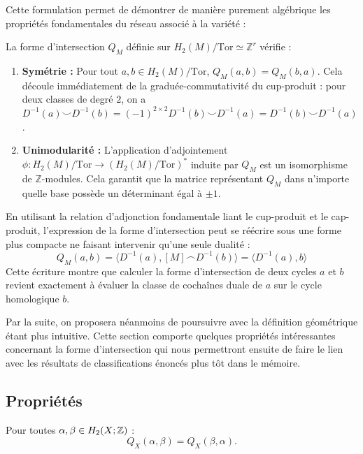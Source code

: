 Cette formulation permet de démontrer de manière purement algébrique les propriétés fondamentales du réseau associé à la variété :

\begin{proposition}
La forme d'intersection $Q_M$ définie sur $H_2(M)/\text{Tor} \simeq \mathbb{Z}^r$ vérifie :
\begin{enumerate}
    \item \textbf{Symétrie :} Pour tout $a, b \in H_2(M)/\text{Tor}$, $Q_M(a, b) = Q_M(b, a)$. Cela découle immédiatement de la graduée-commutativité du cup-produit : pour deux classes de degré $2$, on a $D^{-1}(a) \smile D^{-1}(b) = (-1)^{2 \times 2} D^{-1}(b) \smile D^{-1}(a) = D^{-1}(b) \smile D^{-1}(a)$.
    \item \textbf{Unimodularité :} L'application d'adjointement $\phi : H_2(M)/\text{Tor} \to (H_2(M)/\text{Tor})^*$ induite par $Q_M$ est un isomorphisme de $\mathbb{Z}$-modules. Cela garantit que la matrice représentant $Q_M$ dans n'importe quelle base possède un déterminant égal à $\pm 1$.
\end{enumerate}
\end{proposition}

\begin{remark}
En utilisant la relation d'adjonction fondamentale liant le cup-produit et le cap-produit, l'expression de la forme d'intersection peut se réécrire sous une forme plus compacte ne faisant intervenir qu'une seule dualité :
\[
Q_M(a, b) = \langle D^{-1}(a), [M] \frown D^{-1}(b) \rangle = \langle D^{-1}(a), b \rangle
\]
Cette écriture montre que calculer la forme d'intersection de deux cycles $a$ et $b$ revient exactement à évaluer la classe de cochaînes duale de $a$ sur le cycle homologique $b$.
\end{remark}



Par la suite, on proposera néanmoins de poursuivre avec la définition géométrique étant plus intuitive. Cette section comporte quelques propriétés intéressantes concernant la forme d'intersection qui nous permettront ensuite de faire le lien avec les résultats de classifications énoncés plus tôt dans le mémoire.

\subsection{Propriétés}

\begin{proposition}
\label{prop:sym}
Pour toutes $\alpha, \beta \in H_2(X;\mathbb{Z})$ :
\[
  Q_X(\alpha, \beta) = Q_X(\beta, \alpha).
\]
\end{proposition}

